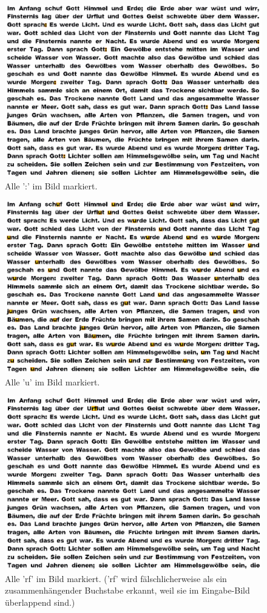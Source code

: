 \documentclass[german,notitlepage,smartquotes]{hgbreport}
\begin{document}
\begin{figure}[h]
\centering
\includegraphics[width=.7\textwidth]{test-05-colon}
\caption{Alle ':' im Bild markiert.}
\label{fig:test-05}
\end{figure}

\begin{figure}[h]
\centering
\includegraphics[width=.7\textwidth]{test-06-u}
\caption{Alle 'u' im Bild markiert.}
\label{fig:test-06}
\end{figure}

\begin{figure}[h]
\centering
\includegraphics[width=.7\textwidth]{test-07-rf}
\caption{Alle 'rf' im Bild markiert. ('rf' wird fälschlicherweise als ein zusammenhängender Buchstabe erkannt, weil sie im Eingabe-Bild überlappend sind.)}
\label{fig:test-07}
\end{figure}
\end{document}
